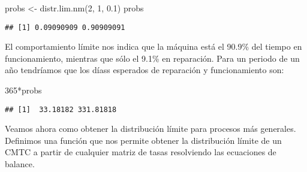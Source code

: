 \documentclass[
]{book}
\newenvironment{Shaded}{\begin{snugshade}}{\end{snugshade}}
\newcommand{\DecValTok}[1]{\textcolor[rgb]{0.00,0.00,0.81}{#1}}
\newcommand{\FloatTok}[1]{\textcolor[rgb]{0.00,0.00,0.81}{#1}}
\newcommand{\FunctionTok}[1]{\textcolor[rgb]{0.00,0.00,0.00}{#1}}
\newcommand{\NormalTok}[1]{#1}
\newcommand{\OtherTok}[1]{\textcolor[rgb]{0.56,0.35,0.01}{#1}}
\newcommand{\SpecialCharTok}[1]{\textcolor[rgb]{0.00,0.00,0.00}{#1}}
\theoremstyle{definition}
\theoremstyle{definition}
\theoremstyle{definition}
\theoremstyle{definition}
\theoremstyle{remark}
\begin{document}
\begin{Shaded}
\begin{Highlighting}[]
\NormalTok{probs }\OtherTok{\textless{}{-}} \FunctionTok{distr.lim.nm}\NormalTok{(}\DecValTok{2}\NormalTok{, }\DecValTok{1}\NormalTok{, }\FloatTok{0.1}\NormalTok{)}
\NormalTok{probs}
\end{Highlighting}
\end{Shaded}

\begin{verbatim}
## [1] 0.09090909 0.90909091
\end{verbatim}

El comportamiento límite nos indica que la máquina está el 90.9\% del tiempo en funcionamiento, mientras que sólo el 9.1\% en reparación. Para un periodo de un año tendríamos que los díass esperados de reparación y funcionamiento son:

\begin{Shaded}
\begin{Highlighting}[]
\DecValTok{365}\SpecialCharTok{*}\NormalTok{probs}
\end{Highlighting}
\end{Shaded}

\begin{verbatim}
## [1]  33.18182 331.81818
\end{verbatim}

Veamos ahora como obtener la distribución límite para procesos más generales. Definimos una función que nos permite obtener la distribución límite de un CMTC a partir de cualquier matriz de tasas resolviendo las ecuaciones de balance.
\end{document}

